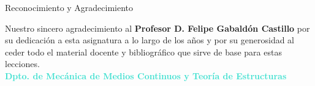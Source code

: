 \documentclass[10pt, aspectratio=43]{beamer}
\begin{document}
\begin{frame}{Reconocimiento y Agradecimiento}{}
  \vfill
  \begin{uicard}[borderline north={4pt}{0pt}{Turquoise}, left=15pt, right=15pt, top=18pt, bottom=18pt]
    \centering
    {\normalsize \textcolor{TextDark}{
      Nuestro sincero agradecimiento al \textbf{Profesor D. Felipe Gabaldón Castillo} por su dedicación a esta asignatura a lo largo de los años y por su generosidad al ceder todo el material docente y bibliográfico que sirve de base para estas lecciones.
    }}\\[0.6cm]
    
    \textcolor{Turquoise}{\small\bfseries Dpto. de Mecánica de Medios Continuos y Teoría de Estructuras}
  \end{uicard}
  \vfill
\end{frame}
\end{document}
